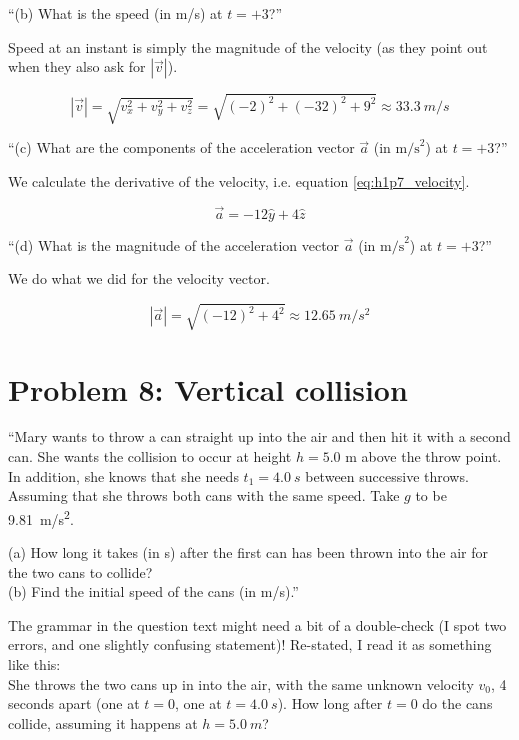 \documentclass[8.01x]{subfiles}
\begin{document}
``(b) What is the speed (in m/s) at $t =+3$?''

Speed at an instant is simply the magnitude of the velocity (as they point out when they also ask for $|\vec{v}|$).

\begin{equation}
|\vec{v}| = \sqrt{v_x^2 + v_y^2 + v_z^2} = \sqrt{(-2)^2 + (-32)^2 + 9^2} \approx \SI{33.3}{m/s}
\end{equation}

``(c) What are the components of the acceleration vector $\vec{a}$ (in $\text{m/s}^2$) at $t = +3$?''

We calculate the derivative of the velocity, i.e. equation \eqref{eq:h1p7_velocity}.

\begin{equation}
\vec{a} = -12 \hat{y} + 4\hat{z}
\end{equation}

``(d) What is the magnitude of the acceleration vector $\vec{a}$ (in $\text{m/s}^2$) at $t = +3$?''

We do what we did for the velocity vector.

\begin{equation}
|\vec{a}| = \sqrt{(-12)^2 + 4^2} \approx \SI{12.65}{m/s^2}
\end{equation}

\section{Problem 8: Vertical collision}

``Mary wants to throw a can straight up into the air and then hit it with a second can. She wants the collision to occur at height $h = 5.0$ m above the throw point. In addition, she knows that she needs $t_1 = \SI{4.0}{s}$ between successive throws. Assuming that she throws both cans with the same speed. Take $g$ to be \SI{9.81}{m/s^2}.

(a) How long it takes (in s) after the first can has been thrown into the air for the two cans to collide?\\
(b) Find the initial speed of the cans (in m/s).''

The grammar in the question text might need a bit of a double-check (I spot two errors, and one slightly confusing statement)! Re-stated, I read it as something like this:\\
She throws the two cans up in into the air, with the same unknown velocity $v_0$, 4 seconds apart (one at $t = 0$, one at $t = \SI{4.0}{s}$). How long after $t = 0$ do the cans collide, assuming it happens at $h = \SI{5.0}{m}$?
\end{document}
